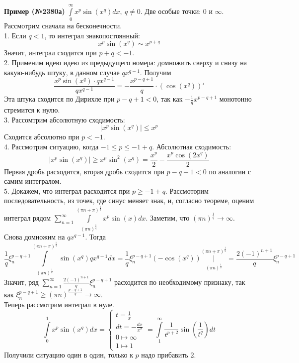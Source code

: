 \textbf{Пример (№2380а)} $\int\limits_{0}^{\infty}x^p\sin(x^q)dx,~q\ne 0$. 
Две особые точки: $0$ и  $\infty$. Рассмотрим сначала на бесконечности.\\
1. Если $q<1$, то интеграл знакопостоянный:
$$x^p\sin(x^q)\sim x^{p+q}$$ 
Значит, интеграл сходится при $p+q<-1$.\\
2. Применим идею идею из предыдущего номера: 
домножить сверху и снизу на какую-нибудь штуку, в данном случае $qx^{q-1}$. 
Получим
$$\frac{x^p\sin(x^q)\cdot qx^{q-1}}{qx^{q-1}}=- \frac{x^{p-q+1}}{q}\cdot 
(\cos(x^q))'$$
Эта штука сходится по Дирихле при $p-q+1<0$, так как $-\frac{1}{q}x^{p-q+1}$ 
монотонно стремится к нулю.\\
3. Рассомтрим абсолютную сходимость:
$$|x^p\sin(x^q)|\leqslant x^p $$
Сходится абсолютно при $p<-1$.\\
4. Рассмотрим ситуацию, когда  $-1\leqslant p\leqslant -1+q$. 
Абсолютная сходимость: 
$$|x^p\sin(x^q)|\geqslant x^p\sin^2(x^q)=\frac{x^p}{2}-
\frac{x^p\cos(2x^q)}{2}$$
Первая дробь расходится, вторая дробь сходится при $p-q+1<0$ по аналогии
с самим интегралом.\\
5. Докажем, что интеграл расходится при $p\geqslant -1 + q$.
Рассмоторим последовательность, из точек, где синус меняет знак, и, согласно
теореме, оценим интеграл рядом 
$\sum\limits_{n=1}^{\infty}\int\limits_{(\pi n)^
{\frac{1}{q}}}^{(\pi n+\pi)^{\frac{1}{q}}}x^p\sin(x)dx$. 
Заметим, что $(\pi n)^{\frac{1}{q}}\to \infty$. Снова домножим на $qx^{q-1}$.
Тогда
$$\frac{1}{q}\xi_n^{p-q+1}\int\limits_{(\pi n)^{\frac{1}{q}}}^{(\pi n+\pi)^
{\frac{1}{q}}}\sin(x^q)qx^{q-1}dx=
\frac{1}{q}\xi_n^{p-q+1}\left( -\cos(x^q) \right) \big|
\limits_{(\pi n)^{\frac{1}{q}}}^{(\pi n+\pi)^{\frac{1}{q}}}=
\frac{2(-1)^{n+1}}{q}\xi_n^{p-q+1}$$
Значит, ряд $\sum\limits_{n=1}^{\infty}\frac{2(-1)^{n+1}}{q}\xi_n^{p-q+1}$
расходится по необходимому признаку, так как $\xi_n^{p-q+1}\geqslant
(\pi n)^{\frac{p-q+1}{q}}\to \infty$.\\
Теперь рассмотрим интеграл в нуле. 
$$\int\limits_{0}^{1}x^p\sin(x^q)dx=\begin{cases}t=\frac{1}{x}\\
dt=-\frac{dx}{x^2}\\0\mapsto \infty\\1\mapsto 1 \end{cases}=
\int\limits_{1}^{\infty}\frac{1}{t^{p+2}}\sin\left(\frac{1}{t^q}\right)dt$$
Получили ситуацию один в один, только к $p$ надо прибавить 2.

